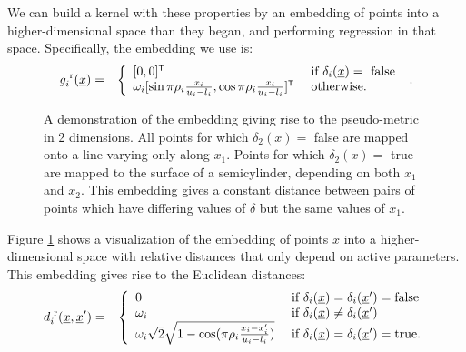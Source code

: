 \documentclass{article}
\newcommand{\vect}[1]{\underline{\smash{#1}}}
\renewcommand{\v}[1]{\vect{#1}}
\newcommand{\reals}{\mathds{R}}
\newcommand{\sX}{\mathcal{X}}
\newcommand{\br}{^{\text{\textnormal{ r}}}}
\newcommand\transpose{{\textrm{\tiny{\sf{T}}}}}
\newcommand{\embeddingletter}{g}
\begin{document}
We can build a kernel with these properties by an embedding of points into a higher-dimensional space than they began, and performing regression in that space.  Specifically, the embedding we use is:
%
%
%
\begin{eqnarray}
\nonumber{}\embeddingletter_i\br(\v{x}) & = & \left\{\begin{array}{ll}
[0,0]^\transpose & \textrm{ if } \delta_i(\v{x}) = \textrm{ false }\\
\nonumber{} \omega_i [\sin{\pi\rho_i\frac{x_i}{u_i-l_i}}, \cos{\pi\rho_i\frac{x_i}{u_i-l_i}}]^\transpose & \textrm{ otherwise.}\end{array}\right..
\end{eqnarray}
%
\begin{figure}

\caption{A demonstration of the embedding giving rise to the pseudo-metric in 2 dimensions.  All points for which $\delta_2(x) =$ false are mapped onto a line varying only along $x_1$.  Points for which $\delta_2(x) =$ true are mapped to the surface of a semicylinder, depending on both $x_1$ and $x_2$.  This embedding gives a constant distance between pairs of points which have differing values of $\delta$ but the same values of $x_1$.
}
\label{fig:cylinder}
\end{figure}
%
Figure \ref{fig:cylinder} shows a visualization of the embedding of points $x$ into a higher-dimensional space with relative distances that only depend on active parameters.
%
This embedding gives rise to the Euclidean distances:
%
\begin{eqnarray}
\nonumber{}d\br_i(\v{x}, \v{x}') & = & \left\{\begin{array}{ll}
\nonumber{} 0 & \textrm{ if } \delta_i(\v{x}) = \delta_i(\v{x}') = \textrm{false}\\
\nonumber{} \omega_i & \textrm{ if } \delta_i(\v{x}) \neq \delta_i(\v{x}')\\
\nonumber{} \omega_i \sqrt{2} \sqrt{1 - \cos(\pi\rho_i \frac{x_i-x_i'}{u_i-l_i})} & \textrm{ if } \delta_i(\v{x}) = \delta_i(\v{x}') = \textrm{true}. \end{array}\right.
\end{eqnarray}
\end{document}
